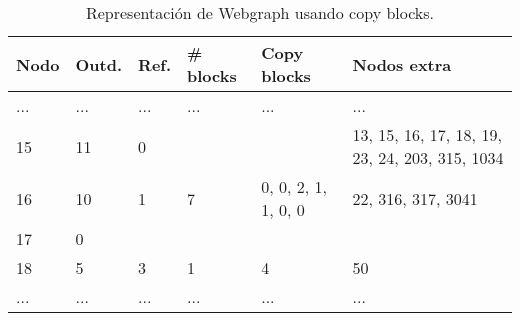 \begin{table}%
\caption{Representación de Webgraph usando copy blocks.}
\label{table:webgraph3}
\centering
\scriptsize

\begin{tabular}{|l|l|l|l|l|l|}
	\toprule
	Nodo & Outd. & Ref. & \# blocks & Copy blocks & Nodos extra \\
	\midrule
	... & ... & ... & ... & ... & ... \\
	15 & 11 & 0 &  &  & 13, 15, 16, 17, 18, 19, 23, 24, 203, 315, 1034 \\
	16 & 10 & 1 & 7 & 0, 0, 2, 1, 1, 0, 0 & 22, 316, 317, 3041 \\
	17 & 0 &  &  &  & \\
	18 & 5 & 3 & 1 & 4 & 50 \\
	... & ... & ... & ... & ... & ... \\
\end{tabular}
\end{table}
